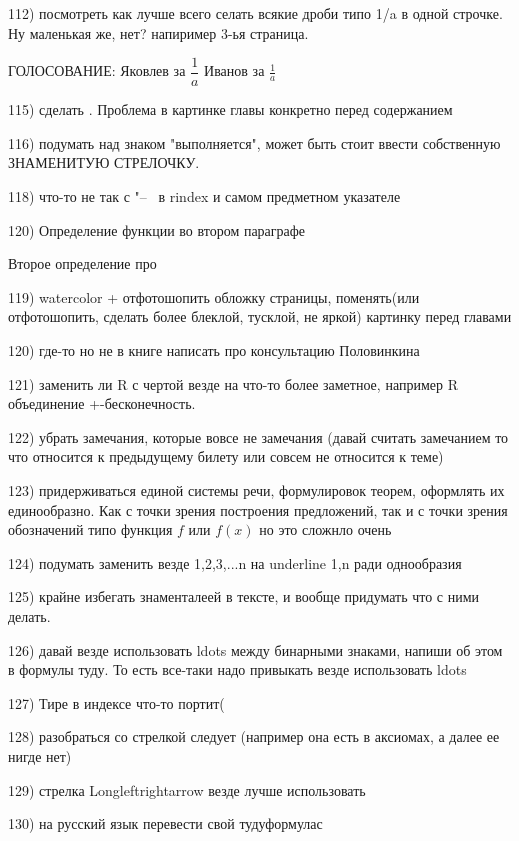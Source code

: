 112) посмотреть как лучше всего селать всякие дроби типо 1/a  в одной строчке. Ну маленькая же, нет? напиример 3-ья страница.

ГОЛОСОВАНИЕ: 
Яковлев за $\dfrac{1}{a}$
Иванов за $\frac{1}{a}$

115) сделать . Проблема в картинке главы конкретно перед содержанием

116) подумать над знаком "выполняется", может быть стоит ввести собственную ЗНАМЕНИТУЮ СТРЕЛОЧКУ.

118) что-то не так с "--~ в rindex и самом предметном указателе

120) Определение функции во втором параграфе 

Второе определение про 
\begin{defnn}
\end{defnn}

119) watercolor + отфотошопить обложку страницы, поменять(или отфотошопить, сделать более блеклой, тусклой, не яркой) картинку перед главами 

120) где-то но не в книге написать про консультацию Половинкина

121) заменить ли R с чертой везде на что-то более заметное, например R объединение +-бесконечность.

122) убрать замечания, которые вовсе не замечания (давай считать замечанием то что относится к предыдущему билету или совсем не относится к теме)

123) придерживаться единой системы речи, формулировок теорем, оформлять их единообразно. Как с точки зрения построения предложений, так и с точки зрения обозначений типо функция $f$ или $f(x)$ но это сложнло очень

124) подумать заменить везде 1,2,3,...n на underline 1,n ради однообразия

125) крайне избегать знаменталеей в тексте, и вообще придумать что с ними делать.

126) давай везде использовать ldots между бинарными знаками, напиши об этом в формулы туду. То есть все-таки надо привыкать везде использовать ldots

127) Тире в индексе что-то портит(

128) разобраться со стрелкой следует (например она есть в аксиомах, а далее ее нигде нет)

129) стрелка Longleftrightarrow везде лучше использовать

130) на русский язык перевести свой тудуформулас

